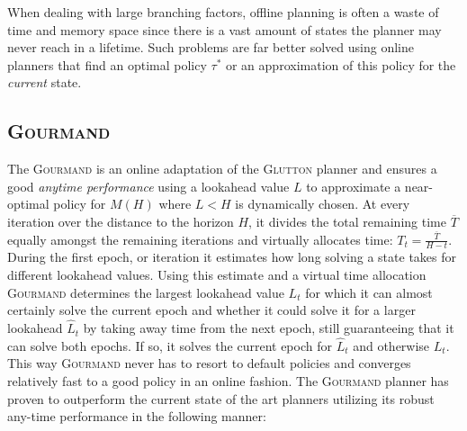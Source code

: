 \documentclass[runningheads,a4paper]{llncs}
\begin{document}

When dealing with large branching factors, offline planning is often a waste of time and memory space since there is a vast amount of states the planner may never reach in a lifetime. Such problems are far better solved using online planners that find an optimal policy $\tau^*$ or an approximation of this policy for the \emph{current} state.

\subsection{\textsc{Gourmand}}
The \textsc{Gourmand} is an online adaptation of the \textsc{Glutton} planner and ensures a good \emph{anytime performance} using a lookahead value $L$ to approximate a near-optimal policy for $M(H)$ where $L < H$ is dynamically chosen. At every iteration over the distance to the horizon $H$, it divides the total remaining time $\overline{T}$ equally amongst the remaining iterations and virtually allocates time: $T_t = \frac{\overline{T}}{H - t}$. During the first epoch, or iteration it estimates how long solving a state takes for different lookahead values. Using this estimate and a virtual time allocation \textsc{Gourmand} determines the largest lookahead value $L_t$ for which it can almost certainly solve the current epoch and whether it could solve it for a larger lookahead $\widehat{L}_t$ by taking away time from the next epoch, still guaranteeing that it can solve both epochs. If so, it solves the current epoch for $\widehat{L}_t$ and otherwise $L_t$. This way \textsc{Gourmand} never has to resort to default policies and converges relatively fast to a good policy in an online fashion. The \textsc{Gourmand} planner has proven to outperform the current state of the art planners utilizing its robust any-time performance \cite{kolobov2012gourmand} in the following manner:
\end{document}
